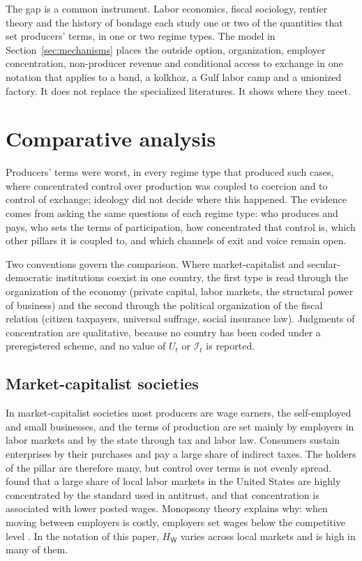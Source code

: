 \documentclass[11pt,letterpaper]{article}
\theoremstyle{definition}
\theoremstyle{remark}
\newcommand{\pW}{\mathsf{W}}
\newcommand{\Integ}{\mathcal{I}}
\newcommand{\HW}{H_{\pW}}
\begin{document}
The gap is a common instrument. Labor economics, fiscal sociology, rentier theory and the history of bondage each study one or two of the quantities that set producers' terms, in one or two regime types. The model in Section~\ref{sec:mechanisms} places the outside option, organization, employer concentration, non-producer revenue and conditional access to exchange in one notation that applies to a band, a kolkhoz, a Gulf labor camp and a unionized factory. It does not replace the specialized literatures. It shows where they meet.

\section{Comparative analysis}
\label{sec:comparison}

Producers' terms were worst, in every regime type that produced such cases, where concentrated control over production was coupled to coercion and to control of exchange; ideology did not decide where this happened. The evidence comes from asking the same questions of each regime type: who produces and pays, who sets the terms of participation, how concentrated that control is, which other pillars it is coupled to, and which channels of exit and voice remain open.

Two conventions govern the comparison. Where market-capitalist and secular-democratic institutions coexist in one country, the first type is read through the organization of the economy (private capital, labor markets, the structural power of business) and the second through the political organization of the fiscal relation (citizen taxpayers, universal suffrage, social insurance law). Judgments of concentration are qualitative, because no country has been coded under a preregistered scheme, and no value of $U_t$ or $\Integ_t$ is reported.

\subsection{Market-capitalist societies}

In market-capitalist societies most producers are wage earners, the self-employed and small businesses, and the terms of production are set mainly by employers in labor markets and by the state through tax and labor law. Consumers sustain enterprises by their purchases and pay a large share of indirect taxes. The holders of the pillar are therefore many, but control over terms is not evenly spread. \citet{azar2022} found that a large share of local labor markets in the United States are highly concentrated by the standard used in antitrust, and that concentration is associated with lower posted wages. Monopsony theory explains why: when moving between employers is costly, employers set wages below the competitive level \citep{manning2003}. In the notation of this paper, $\HW$ varies across local markets and is high in many of them.
\end{document}
